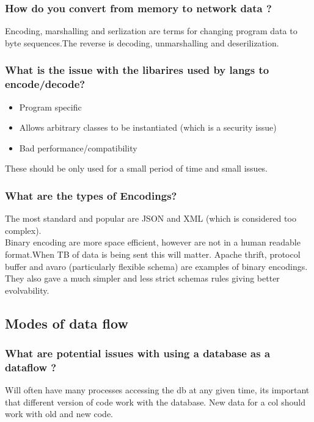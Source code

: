 \documentclass[11pt]{scrartcl} %
\begin{document}
\subsubsection{How do you convert from memory to network data ?}

Encoding, marshalling and serlization are terms for changing program data to byte sequences.The
reverse is decoding, unmarshalling and deserilization.

\subsubsection{What is the issue with the libarires used by langs to encode/decode?}

\begin{itemize}
	\item Program specific
	\item Allows arbitrary classes to be instantiated (which is a security issue)
	\item Bad performance/compatibility
\end{itemize}

These should be only used for a small period of time and small issues.

\subsubsection{What are the types of Encodings?}

The most standard and popular are JSON and XML (which is considered too complex).\\

Binary encoding are more space efficient, however are not in a human readable format.When TB of data
is being sent this will matter. Apache thrift, protocol buffer and avaro (particularly flexible schema) are examples of binary encodings.
They also gave a much simpler and less strict schemas rules giving better evolvability.

\subsection{Modes of data flow}

\subsubsection{What are potential issues with using a database as a dataflow ?}

Will often have many processes accessing the db at any given time, its important that different
version of code work with the database. New data for a col should work with old and new code.\\
\end{document}

